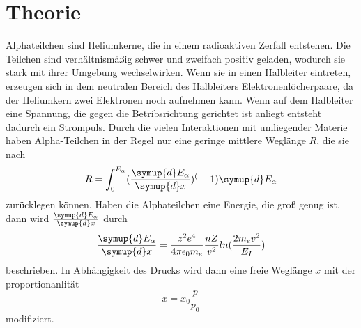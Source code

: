 \section{Theorie}
\label{sec:Theorie}

Alphateilchen sind Heliumkerne, die in einem radioaktiven Zerfall entstehen. Die Teilchen sind verhältnismäßig
schwer und zweifach positiv geladen, wodurch sie stark mit ihrer Umgebung wechselwirken. Wenn sie in einen
Halbleiter eintreten, erzeugen sich in dem neutralen Bereich des Halbleiters Elektronenlöcherpaare, da der Heliumkern
zwei Elektronen noch aufnehmen kann. Wenn auf dem Halbleiter eine Spannung, die gegen die Betribsrichtung gerichtet ist anliegt
entsteht dadurch ein Strompuls. Durch die vielen Interaktionen mit umliegender Materie haben Alpha-Teilchen in der Regel
nur eine geringe mittlere Weglänge $R$, die sie nach
\begin{equation}
    R=\int_0^{E_\alpha}(\frac{\symup{d}E_\alpha}{\symup{d}x})^(-1)\symup{d}E_\alpha  
    \label{eqn:Weglänge}
\end{equation}
\noindent zurücklegen können. Haben die Alphateilchen eine Energie, die groß genug ist, dann wird $\frac{\symup{d}E_\alpha}{\symup{d}x}$
durch
\begin{equation}
    \frac{\symup{d}E_\alpha}{\symup{d}x}=\frac{z^2 e^4}{4\pi \epsilon_0 m_e}\frac{nZ}{v^2}ln(\frac{2m_ev^2}{E_I})
    \label{eqn:bethe}
\end{equation}
\noindent beschrieben.
In Abhängigkeit des Drucks wird dann eine freie Weglänge $x$ mit der proportionanlität
\begin{equation}
    x=x_0\frac{p}{p_0}
    \label{eqn:druck}
\end{equation}
modifiziert.
\cite{sample}
